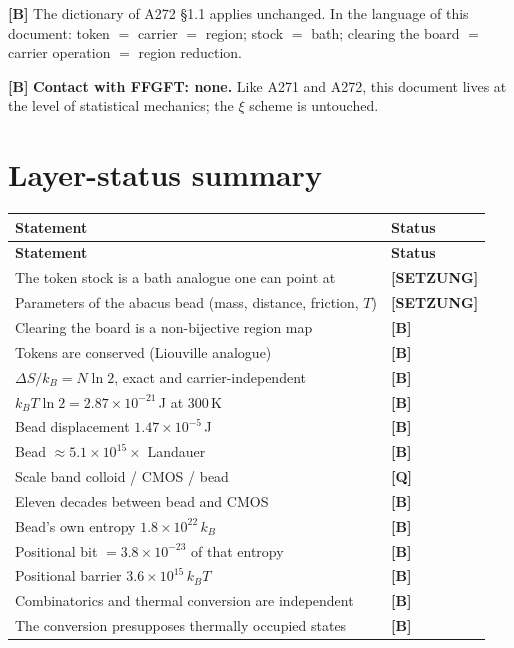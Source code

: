 \textbf{[B]} The dictionary of A272 §1.1 applies unchanged. In the language of this
document: token $=$ carrier $=$ region; stock $=$ bath; clearing the board $=$
carrier operation $=$ region reduction.

\textbf{[B]} \textbf{Contact with FFGFT: none.} Like A271 and A272, this document lives at
the level of statistical mechanics; the $\xi$ scheme is untouched.

\section{Layer-status summary}

\begin{center}
\small
\begin{longtable}{@{}p{}l@{}}
\toprule
\textbf{Statement} & \textbf{Status} \\
\midrule
\endfirsthead
\toprule
\textbf{Statement} & \textbf{Status} \\
\midrule
\endhead
The token stock is a bath analogue one can point at & \textbf{[SETZUNG]} \\
Parameters of the abacus bead (mass, distance, friction, $T$) & \textbf{[SETZUNG]} \\
Clearing the board is a non-bijective region map & \textbf{[B]} \\
Tokens are conserved (Liouville analogue) & \textbf{[B]} \\
$\Delta S/k_B = N\ln 2$, exact and carrier-independent & \textbf{[B]} \\
$k_BT\ln 2 = 2.87\times10^{-21}$\,J at 300\,K & \textbf{[B]} \\
Bead displacement $1.47\times10^{-5}$\,J & \textbf{[B]} \\
Bead $\approx 5.1\times10^{15}\times$ Landauer & \textbf{[B]} \\
Scale band colloid / CMOS / bead & \textbf{[Q]} \\
Eleven decades between bead and CMOS & \textbf{[B]} \\
Bead's own entropy $1.8\times10^{22}\,k_B$ & \textbf{[B]} \\
Positional bit $= 3.8\times10^{-23}$ of that entropy & \textbf{[B]} \\
Positional barrier $3.6\times10^{15}\,k_BT$ & \textbf{[B]} \\
Combinatorics and thermal conversion are independent & \textbf{[B]} \\
The conversion presupposes thermally occupied states & \textbf{[B]} \\

\end{longtable}
\end{center}
